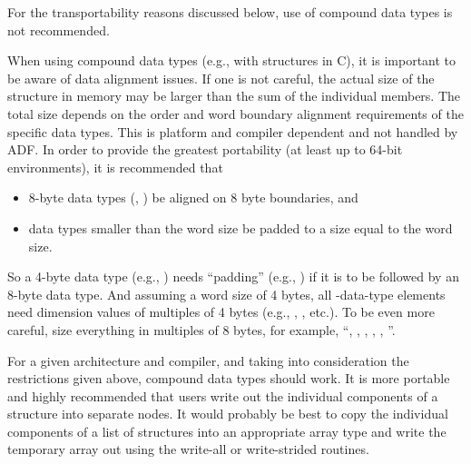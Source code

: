 For the transportability reasons discussed below, use of compound data
types is not recommended.

When using compound data types (e.g., with structures in C), it is
important to be aware of data alignment issues.
If one is not careful, the actual size of the structure in memory may be
larger than the sum of the individual members.
The total size depends on the order and word boundary alignment
requirements of the specific data types.
This is platform and compiler dependent and not handled by ADF.
In order to provide the greatest portability (at least up to 64-bit
environments), it is recommended that

\begin{itemize}
\item 8-byte data types (, ) be aligned on 8 byte
      boundaries, and
\item data types smaller than the word size be padded to a size equal to
      the word size.
\end{itemize}

So a 4-byte data type (e.g., ) needs ``padding'' (e.g.,
) if it is to be followed by an 8-byte data type.
And assuming a word size of 4 bytes, all -data-type elements
need dimension values of multiples of 4 bytes (e.g., ,
, etc.).
To be even more careful, size everything in multiples of 8 bytes,
for example, ``, , ,
, , ''.

For a given architecture and compiler, and taking into consideration the
restrictions given above, compound data types should work.
It is more portable and highly recommended that users write out the
individual components of a structure into separate nodes.
It would probably be best to copy the individual components of a list of
structures into an appropriate array type and write the temporary array
out using the write-all or write-strided routines.

